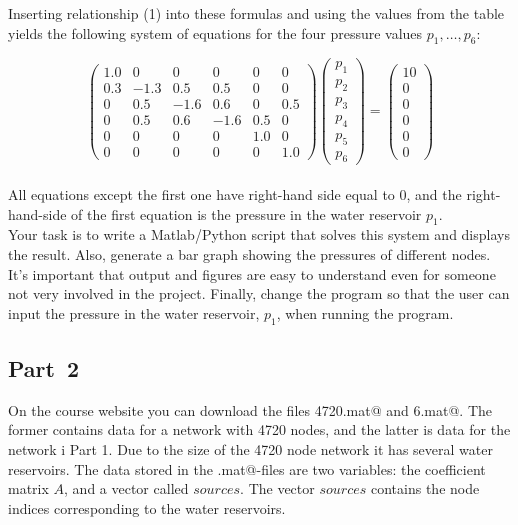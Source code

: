 \documentclass[11pt,a4paper]{article}
\begin{document}
\noindent Inserting relationship (1) into these formulas and using the values from the table yields the following system of equations for the four pressure values  $p_1,\ldots, p_6$:

\begin{equation}
\left(\begin{array}{cccccc}
    1.0   &0        & 0      &   0      &   0    & 0     \\
    0.3   & -1.3  &  0.5  &   0.5   &   0    & 0     \\
    0      &   0.5  & -1.6  &  0.6   &   0    & 0.5  \\
    0      &   0.5  &   0.6 & -1.6   &   0.5 & 0     \\
  0        &   0     &   0     &   0      &  1.0  & 0     \\
  0        &   0     &   0     &   0     &   0     & 1.0 
 \end{array}\right)
\left(\begin{array}{c} 
p_1  \\ 
p_2  \\
p_3  \\ 
p_4  \\
p_5   \\
p_6
\end{array}\right) =
\left(\begin{array}{c} 
10 \\
0    \\
0    \\
0    \\
0    \\
0
\end{array}\right)
\label{eq:matsys}
\end{equation}\\
\noindent All equations except the first one have right-hand side equal to 0, and the right-hand-side of the first equation is the pressure in the water reservoir $p_1$.
\\

\noindent Your task is to write a Matlab/Python script that solves this system and displays the result. Also, generate a bar graph showing the pressures of different nodes. It's important that output and figures are easy to understand even for someone not very involved in the project. Finally, change the program so that the user can input the pressure in the water reservoir, $p_1$, when running the program.   

\subsection*{Part~2}
On the course website you can download the files \verb@water4720.mat@ and \verb@water6.mat@. The former contains data for a network with 4720 nodes, and the latter is data for the network i Part 1. Due to the size of the 4720 node network it has several water reservoirs. The data stored in the \verb@.mat@-files are two variables: the coefficient matrix $A$, and a vector called $sources$. The vector $sources$ contains the node indices corresponding to the water reservoirs. 
\end{document}
